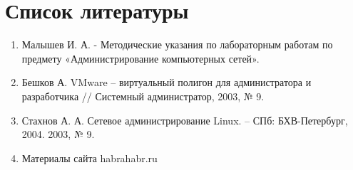 \documentclass[a4paper, 12pt]{article}		%
\begin{document}
\newpage
\section*{Список литературы}

\begin{enumerate}
\item Малышев И. А. - Методические указания по лабораторным работам по предмету «Администрирование компьютерных сетей».
\item Бешков А. VMware – виртуальный полигон для администратора и разработчика // Системный администратор, 2003, № 9.
\item Стахнов А. А. Сетевое администрирование Linux. – СПб: БХВ-Петербург, 2004.
2003, № 9.
\item Материалы сайта habrahabr.ru
\end{enumerate}
\end{document}
